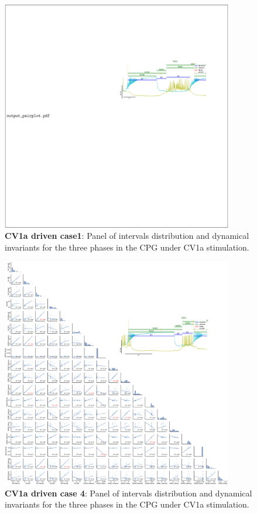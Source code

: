 \begin{figure}[htbp]
	\centering
	\includegraphics[width=0.9\textwidth]{./img/invariants/data/SUSSEX/CV1a_driven1/images/3phases/panel_with_pairplot.pdf}
	\caption{\textbf{CV1a driven case1}: Panel of intervals distribution and dynamical invariants for the three phases in the CPG under CV1a stimulation.}
	\label{fig:cv1a 1 3phases pairplot}
\end{figure}


\begin{figure}[htbp]
	\centering
	\includegraphics[width=0.9\textwidth]{./img/invariants/data/SUSSEX/CV1a_driven4/images/3phases/panel_with_pairplot.pdf}
	\caption{\textbf{CV1a driven case 4}: Panel of intervals distribution and dynamical invariants for the three phases in the CPG under CV1a stimulation.}
	\label{fig:cv1a 4 3phases pairplot}
\end{figure}



